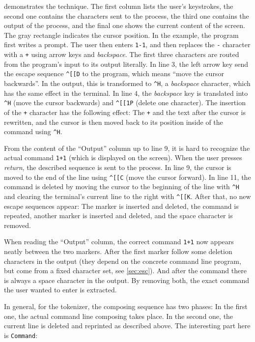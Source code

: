 \documentclass[paper=a4,twoside,abstract=on,cleardoublepage=empty,numbers=noenddot,toc=bib,12pt,appendixprefix=true]{scrreprt}
\newcommand{\escape}[1]{\textasciicircum #1}
\begin{document}
 demonstrates the technique. The first column lists the user's keystrokes, the second one contains the characters sent to the process, the third one contains the output of the process, and the final one shows the current content of the screen. The gray rectangle indicates the cursor position. In the example, the program first writes a prompt. The user then enters \texttt{1-1}, and then replaces the \texttt{-} character with a \texttt{+} using arrow keys and \emph{backspace}. The first three characters are routed from the program's input to its output literally. In line 3, the left arrow key send the escape sequence \texttt{\escape{[}[D} to the program, which means “move the cursor backwards”. In the output, this is transformed to \texttt{\escape{H}}, a \emph{backspace} character, which has the same effect in the terminal. In line 4, the \emph{backspace} key is translated into \texttt{\escape{H}} (move the cursor backwards) and \texttt{\escape{[}[1P} (delete one character). The insertion of the \texttt{+} character has the following effect: The \texttt{+} and the text after the cursor is rewritten, and the cursor is then moved back to its position inside of the command using \texttt{\escape{H}}.

From the content of the “Output” column up to line 9, it is hard to recognize the actual command \texttt{1+1} (which is displayed on the screen). When the user presses \emph{return}, the described sequence is sent to the process. In line 9, the cursor is moved to the end of the line using \texttt{\escape{[}[C} (move the cursor forward). In line 11, the command is deleted by moving the cursor to the beginning of the line with \texttt{\escape{H}} and clearing the terminal's current line to the right with \texttt{\escape{[}[K}. After that, no new escape sequences appear: The marker is inserted and deleted, the command is repeated, another marker is inserted and deleted, and the space character is removed.

When reading the “Output” column, the correct command \texttt{1+1} now appears neatly between the two markers. After the first marker follow some deletion characters in the output (they depend on the concrete command line program, but come from a fixed character set, see \cref{sec:esc}). And after the command there is always a space character in the output. By removing both, the exact command the user wanted to enter is extracted.

In general, for the tokenizer, the composing sequence has two phases: In the first one, the actual command line composing takes place. In the second one, the current line is deleted and reprinted as described above. The interesting part here is \texttt{Command}:
\end{document}
